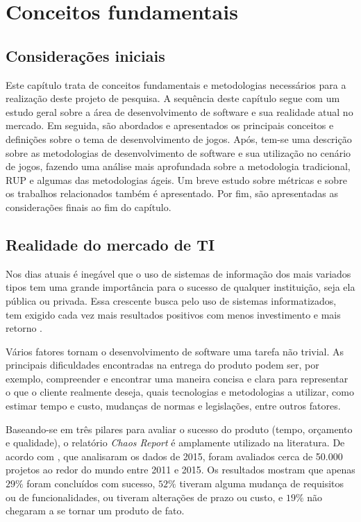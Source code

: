 \documentclass[quali]{ppgccufscar}
\begin{document}
\chapter{Conceitos fundamentais}
\label{cap_2}


\section{Considerações iniciais}

Este capítulo trata de conceitos fundamentais e metodologias necessários para a realização deste projeto de pesquisa. A sequência deste capítulo segue com um estudo geral sobre a área de desenvolvimento de software e sua realidade atual no mercado. Em seguida, são abordados e apresentados os principais conceitos e definições sobre o tema de desenvolvimento de jogos. Após, tem-se uma descrição sobre as metodologias de desenvolvimento de software e sua utilização no cenário de jogos, fazendo uma análise mais aprofundada sobre a metodologia tradicional, RUP e algumas das metodologias ágeis. Um breve estudo sobre métricas e sobre os trabalhos relacionados também é apresentado. Por fim, são apresentadas as considerações finais ao fim do capítulo.


\section{Realidade do mercado de TI}
\label{sec_mercado}

Nos dias atuais é inegável que o uso de sistemas de informação dos mais variados tipos tem uma grande importância para o sucesso de qualquer instituição, seja ela pública ou privada. Essa crescente busca pelo uso de sistemas informatizados, tem exigido cada vez mais resultados positivos com menos investimento e mais retorno \cite{roberts2011}. 

Vários fatores tornam o desenvolvimento de software uma tarefa não trivial. As principais  dificuldades encontradas na entrega do produto podem ser, por exemplo, compreender e encontrar uma maneira concisa e clara para representar o que o cliente realmente deseja, quais tecnologias e metodologias a utilizar, como estimar tempo e custo, mudanças de normas e legislações, entre outros fatores.

Baseando-se em três pilares para avaliar o sucesso do produto (tempo, orçamento e qualidade), o relatório \textit{Chaos Report} é amplamente utilizado na literatura. De acordo com , que analisaram os dados de 2015, foram avaliados cerca de 50.000 projetos ao redor do mundo entre 2011 e 2015. Os resultados mostram que apenas $29\%$ foram concluídos com sucesso, $52\%$ tiveram alguma mudança de requisitos ou de funcionalidades, ou tiveram alterações de prazo ou custo, e $19\%$ não chegaram a se tornar um produto de fato.
\end{document}
